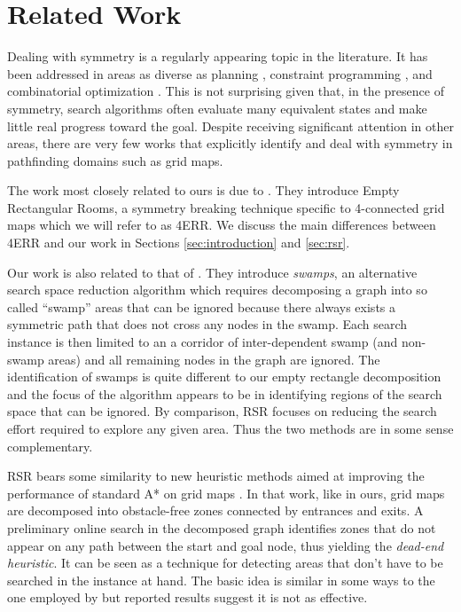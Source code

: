 \section{Related Work}
\label{sec:relatedwork}
Dealing with symmetry is a regularly appearing topic in the literature.  It has
been addressed in areas as diverse as planning \cite{fox99}, constraint programming
\cite{gent00}, and combinatorial optimization \cite{fukunaga08}.  This is not
surprising given that, in the presence of symmetry, search algorithms often
evaluate many equivalent states and make little real progress toward the goal.
Despite receiving significant attention in other areas, there are very few
works that explicitly identify and deal with symmetry in pathfinding domains 
such as grid maps. 
\par
The work most closely related to ours is due to
\cite{harabor10}.  They introduce Empty Rectangular
Rooms, a symmetry breaking technique specific to 4-connected grid maps which we
will refer to as 4ERR.  We discuss the main differences between 4ERR and our
work in Sections \ref{sec:introduction} and \ref{sec:rsr}.
\par
Our work is also related to that of
\cite{pochter10}.  They introduce \emph{swamps}, an
alternative search space reduction algorithm which requires decomposing a graph
into so called ``swamp'' areas that can be ignored because there always exists a
symmetric path that does not cross any nodes in the swamp.  Each search instance
is then limited to an a corridor of inter-dependent swamp (and non-swamp areas)
and all remaining nodes in the graph are ignored.  The identification of swamps
is quite different to our empty rectangle decomposition and the focus of the
algorithm appears to be in identifying regions of the search space that can be
ignored.  By comparison, RSR focuses on reducing the search effort required to
explore any given area.
Thus the two methods are in some sense complementary.
\par
RSR bears some similarity to new heuristic methods aimed at improving the
performance of standard A* on grid maps \cite{bjornsson06}.  In that work, like
in ours, grid maps are decomposed into obstacle-free zones connected by
entrances and exits.  A preliminary online search in the decomposed graph
identifies zones that do not appear on any path between the start and goal node,
thus yielding the \emph{dead-end heuristic}.  It can be seen as a technique for
detecting areas that don't have to be searched in the instance at hand.
The basic idea is similar in some ways to the one employed by
\cite{pochter10} but reported results suggest it is
not as effective.

